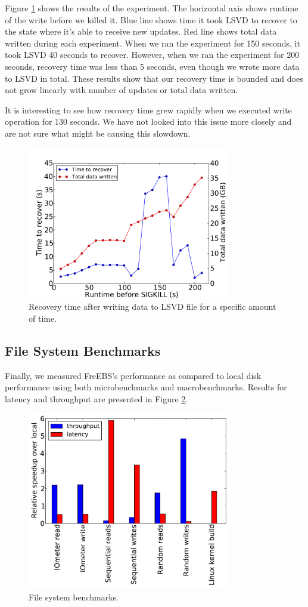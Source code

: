 Figure \ref{fig:checkpointing} shows the results of the experiment. The horizontal axis shows runtime of the write before we killed it. Blue line shows time it took LSVD to recover to the state where it's able to receive new updates. Red line shows total data written during each experiment. When we ran the experiment for 150 seconds, it took LSVD 40 seconds to recover. However, when we ran the experiment for 200 seconds, recovery time was less than 5 seconds, even though we wrote more data to LSVD in total. These results show that our recovery time is bounded and does not grow linearly with number of updates or total data written.

It is interesting to see how recovery time grew rapidly when we executed write operation for 130 seconds. We have not looked into this issue more closely and are not sure what might be causing this slowdown.

\begin{figure}[t!]
  \centering
   \includegraphics[width=3.5in]{figures/checkpointing.pdf}
   \caption{Recovery time after writing data to LSVD file for a specific amount of time.}
   \label{fig:checkpointing}
\end{figure}

\subsection{File System Benchmarks}
Finally, we measured FreEBS's performance as compared to local disk performance using both microbenchmarks and macrobenchmarks. Results for latency and throughput are presented in Figure \ref{fig:benchmarks}.

\begin{figure}[t!]
  \centering
   \includegraphics[width=3.5in]{figures/benchmarks.pdf}
   \caption{File system benchmarks.}
   \label{fig:benchmarks}
\end{figure}

